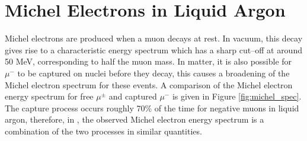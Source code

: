 \section{Michel Electrons in Liquid Argon} \label{ME_LAr}
Michel electrons are produced when a muon decays at rest. In vacuum, this
decay gives rise to a characteristic energy spectrum which has a sharp
cut--off at around 50 MeV, corresponding to half the muon mass. In matter, it
is also possible for $\mu^-$ to be captured on nuclei before they decay, this
causes a broadening of the Michel electron spectrum for these events. A
comparison of the Michel electron energy spectrum for free $\mu^\pm$ and
captured $\mu^-$ is given in Figure \ref{fig:michel_spec}. The capture process
occurs roughly 70\% of the time for negative muons in liquid argon, therefore,
in \protodune{}, the observed Michel electron energy spectrum is a combination
of the two processes in similar quantities.
